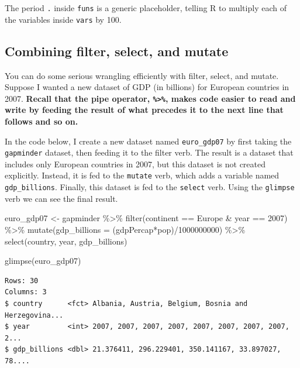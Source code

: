 \documentclass[
]{book}
\makeatletter
\newenvironment{Shaded}{\begin{snugshade}}{\end{snugshade}}
\newcommand{\AttributeTok}[1]{\textcolor[rgb]{0.61,0.61,0.61}{#1}}
\newcommand{\DecValTok}[1]{\textcolor[rgb]{0.06,0.06,0.06}{#1}}
\newcommand{\FunctionTok}[1]{\textcolor[rgb]{0,0,0}{#1}}
\newcommand{\NormalTok}[1]{#1}
\newcommand{\OtherTok}[1]{\textcolor[rgb]{0.37,0.37,0.37}{#1}}
\newcommand{\SpecialCharTok}[1]{\textcolor[rgb]{0,0,0}{#1}}
\newcommand{\StringTok}[1]{\textcolor[rgb]{0.5,0.5,0.5}{#1}}
\newenvironment{kframe}{%
\medskip{}
\setlength{\fboxsep}{.8em}
 \def\at@end@of@kframe{}%
 \ifinner\ifhmode%
  \def\at@end@of@kframe{\end{minipage}}%
  \begin{minipage}{\columnwidth}%
 \fi\fi%
 \def\FrameCommand##1{\hskip\@totalleftmargin \hskip-\fboxsep
 \colorbox{shadecolor}{##1}\hskip-\fboxsep
     \hskip-\linewidth \hskip-\@totalleftmargin \hskip\columnwidth}%
 \MakeFramed {\advance\hsize-\width
   \@totalleftmargin\z@ \linewidth\hsize
   \@setminipage}}%
 {\par\unskip\endMakeFramed%
 \at@end@of@kframe}
\renewenvironment{Shaded}{\begin{kframe}}{\end{kframe}}
\makeatother
\begin{document}
The period \texttt{.} inside \texttt{funs} is a generic placeholder, telling R to multiply each of the variables inside \texttt{vars} by 100.

\hypertarget{combining-filter-select-and-mutate}{%
\subsection{Combining filter, select, and mutate}\label{combining-filter-select-and-mutate}}

You can do some serious wrangling efficiently with filter, select, and mutate. Suppose I wanted a new dataset of GDP (in billions) for European countries in 2007. \textbf{Recall that the pipe operator, \texttt{\%\textgreater{}\%}, makes code easier to read and write by feeding the result of what precedes it to the next line that follows and so on.}

In the code below, I create a new dataset named \texttt{euro\_gdp07} by first taking the \texttt{gapminder} dataset, then feeding it to the filter verb. The result is a dataset that includes only European countries in 2007, but this dataset is not created explicitly. Instead, it is fed to the \texttt{mutate} verb, which adds a variable named \texttt{gdp\_billions}. Finally, this dataset is fed to the \texttt{select} verb. Using the \texttt{glimpse} verb we can see the final result.

\begin{Shaded}
\begin{Highlighting}[]
\NormalTok{euro\_gdp07 }\OtherTok{\textless{}{-}}\NormalTok{ gapminder }\SpecialCharTok{\%\textgreater{}\%} 
  \FunctionTok{filter}\NormalTok{(continent }\SpecialCharTok{==} \StringTok{\textquotesingle{}Europe\textquotesingle{}} \SpecialCharTok{\&}\NormalTok{ year }\SpecialCharTok{==} \DecValTok{2007}\NormalTok{) }\SpecialCharTok{\%\textgreater{}\%} 
  \FunctionTok{mutate}\NormalTok{(}\AttributeTok{gdp\_billions =}\NormalTok{ (gdpPercap}\SpecialCharTok{*}\NormalTok{pop)}\SpecialCharTok{/}\DecValTok{1000000000}\NormalTok{) }\SpecialCharTok{\%\textgreater{}\%} 
  \FunctionTok{select}\NormalTok{(country, year, gdp\_billions)}

\FunctionTok{glimpse}\NormalTok{(euro\_gdp07)}
\end{Highlighting}
\end{Shaded}

\begin{verbatim}
Rows: 30
Columns: 3
$ country      <fct> Albania, Austria, Belgium, Bosnia and Herzegovina...
$ year         <int> 2007, 2007, 2007, 2007, 2007, 2007, 2007, 2007, 2...
$ gdp_billions <dbl> 21.376411, 296.229401, 350.141167, 33.897027, 78....
\end{verbatim}
\end{document}
